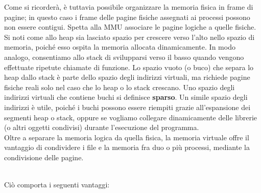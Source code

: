 \documentclass{article}
\begin{document}
			\newpage
			\noindent Come si ricorderà, è tuttavia possibile organizzare la memoria fisica in frame di pagine; in questo caso i frame delle pagine fisiche assegnati ai processi possono non essere contigui. Spetta alla MMU associare le pagine logiche a quelle fisiche.
			\\Si noti come allo heap sia lasciato spazio per crescere verso l’alto nello spazio di memoria, poiché esso ospita la memoria allocata dinamicamente. In modo analogo, consentiamo allo stack di svilupparsi verso il basso quando vengono effettuate ripetute chiamate di funzione. Lo spazio vuoto (o buco) che separa lo heap dallo stack è parte dello spazio degli indirizzi virtuali, ma richiede pagine fisiche reali solo nel caso che lo heap o lo stack crescano. Uno spazio degli indirizzi virtuali che contiene buchi si definisce \textbf{sparso}. Un simile
			spazio degli indirizzi è utile, poiché i buchi possono essere riempiti grazie all’espansione dei segmenti heap o stack, oppure se vogliamo collegare dinamicamente delle
			librerie (o altri oggetti condivisi) durante l’esecuzione del programma.
			\\Oltre a separare la memoria logica da quella fisica, la memoria virtuale offre il vantaggio di condividere i file e la memoria fra duo o più processi, mediante la condivisione delle pagine. 
			\begin{figure}[ht!]
			\end{figure}
			\\Ciò comporta i seguenti vantaggi:
\end{document}
